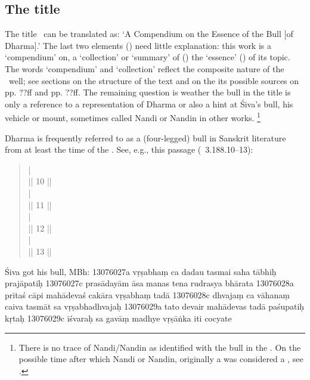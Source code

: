 \documentclass[11pt]{book}
\begin{document}
\subsection{The title}
The title \Vss\ can be translated as:
`A Compendium on the Essence of the Bull [of Dharma].'
The last two elements () need
little explanation: this work is a 
`compendium' on, a `collection' or `summary' of ()
the `essence' () of its topic. The words 
`compendium' and `collection' reflect the composite nature of
the \Vss\ well; see sections on the structure of the text and
on the its possible sources on pp. ??ff and pp. ??ff.
The remaining question is weather the bull in the title 
is only a reference to a representation of Dharma 
or also a hint at Śiva's bull, his vehicle or mount, 
sometimes called Nandi or Nandin in other works.%
		\footnote{There is no trace of Nandi/Nandin 
		as identified with the bull in the \Vss.
		On the possible time after which 
		Nandi or Nandin, originally a  
		was considered a , see 
		.}

Dharma is frequently referred to as a (four-legged) 
bull in Sanskrit literature from at least the time of the \MBh. 
See, e.g., this passage (\MBH\ 3.188.10--13):

\begin{quote}
{\small
   |\\
   || 10 ||\\
   |\\
   || 11 ||\\
   |\\
   || 12 ||\\
   |\\
   || 13 ||\\
  }
\end{quote}

Śiva got his bull, MBh:
13076027a vṛṣabhaṃ ca dadau tasmai saha tābhiḥ prajāpatiḥ
13076027c prasādayām āsa manas tena rudrasya bhārata
13076028a prītaś cāpi mahādevaś cakāra vṛṣabhaṃ tadā
13076028c dhvajaṃ ca vāhanaṃ caiva tasmāt sa vṛṣabhadhvajaḥ
13076029a tato devair mahādevas tadā paśupatiḥ kṛtaḥ
13076029c īśvaraḥ sa gavāṃ madhye vṛṣāṅka iti cocyate
\end{document}
